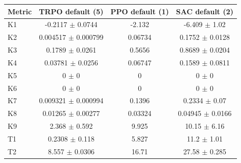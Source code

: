 \begin{tabular}{lccc}
\toprule
Metric & TRPO default (5) & PPO default (1) & SAC default (2) \\
\midrule
K1 & -0.2117 $\pm$ 0.0744 & -2.132 & -6.409 $\pm$ 1.02 \\
K2 & 0.004517 $\pm$ 0.000799 & 0.06734 & 0.1752 $\pm$ 0.0128 \\
K3 & 0.1789 $\pm$ 0.0261 & 0.5656 & 0.8689 $\pm$ 0.0204 \\
K4 & 0.03781 $\pm$ 0.0256 & 0.06747 & 0.1589 $\pm$ 0.0811 \\
K5 & 0 $\pm$ 0 & 0 & 0 $\pm$ 0 \\
K6 & 0 $\pm$ 0 & 0 & 0 $\pm$ 0 \\
K7 & 0.009321 $\pm$ 0.000994 & 0.1396 & 0.2334 $\pm$ 0.07 \\
K8 & 0.01265 $\pm$ 0.00277 & 0.03324 & 0.04945 $\pm$ 0.0166 \\
K9 & 2.368 $\pm$ 0.592 & 9.925 & 10.15 $\pm$ 6.16 \\
T1 & 0.2308 $\pm$ 0.118 & 5.827 & 11.2 $\pm$ 1.01 \\
T2 & 8.557 $\pm$ 0.0306 & 16.71 & 27.58 $\pm$ 0.285 \\
\bottomrule
\end{tabular}
